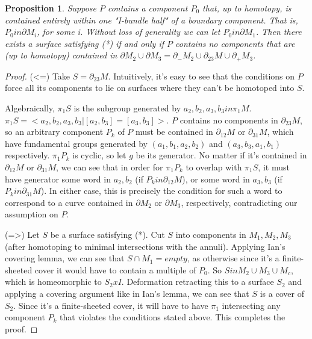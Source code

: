 \documentclass[12pt]{amsart}
\newtheorem{prop}[theorem]{Proposition}
\theoremstyle{definition}
\newcommand{\bd}{\partial}
\begin{document}
\begin{prop}

Suppose $P$ contains a component $P_0$ that, up to homotopy, is
contained entirely within one "I-bundle half" of a boundary component. That is,
$P_0 in \bd M_i$, for some i. Without loss of generality we can let $P_0 in
\bd M_1$. Then
there exists a surface satisfying (*) if and only if $P$ contains no components
that are (up to homotopy) contained in $\bd M_2 \cup \bd M_3 = \bd_-M_2 \cup
\bd_{23}M \cup \bd_+M_3$.

\end{prop}
\begin{proof}

(<=) Take $S=\bd_{23}M$. Intuitively, it's easy to see that the conditions on
$P$ force all its components to lie on surfaces where they can't be homotoped
into $S$.

Algebraically, $\pi_1S$ is the subgroup generated by
$a_2,b_2,a_3,b_3 in \pi_1M$. $\pi_1S = <a_2,b_2,a_3,b_3 | [a_2,b_3]=[a_3,b_3]>$. $P$ contains no
components in $\bd_{23}M$, so an arbitrary component $P_k$ of $P$  must be contained in
$\bd_{12}M$ or $\bd_{31}M$, which have fundamental groups generated by $(a_1,b_1,a_2,b_2)$ and
$(a_3,b_3,a_1,b_1)$ respectively. $\pi_1P_k$ is cyclic, so let $g$ be its generator. No
matter if it's contained in $\bd_{12}M$ or $\bd_{31}M$, we can see that in order for
$\pi_1P_k$ to
overlap with $\pi_1S$, it must have generator some word in $a_2,b_2$ (if $P_k in
\bd_{12}M$),
or some word in $a_3,b_3$ (if $P_k in \bd_{31}M$). In either case, this is precisely the
condition for such a word to correspond to a curve contained in $\bd M_2$ or $\bd M_3$,
respectively, contradicting our assumption on $P$.

(=>) Let $S$ be a surface satisfying (*). Cut $S$ into components in $M_1,M_2,M_3$
(after homotoping to minimal intersections with the annuli). Applying Ian's
covering lemma, we can see that $S \cap M_1 = empty$, as otherwise since it's
a finite-sheeted cover it would have to contain a multiple of $P_0$.
So $S in M_2 \cup M_3 \cup M_c$, which is homeomorphic to $S_2 x I$. Deformation retracting
this to a surface $S_2$ and applying a covering argument like in Ian's lemma, we
can see that $S$ is a cover of $S_2$. Since it's a finite-sheeted cover, it will
have to have $\pi_1$ intersecting any component $P_k$ that violates the conditions
stated above. This completes the proof.

\end{proof}
\end{document}
